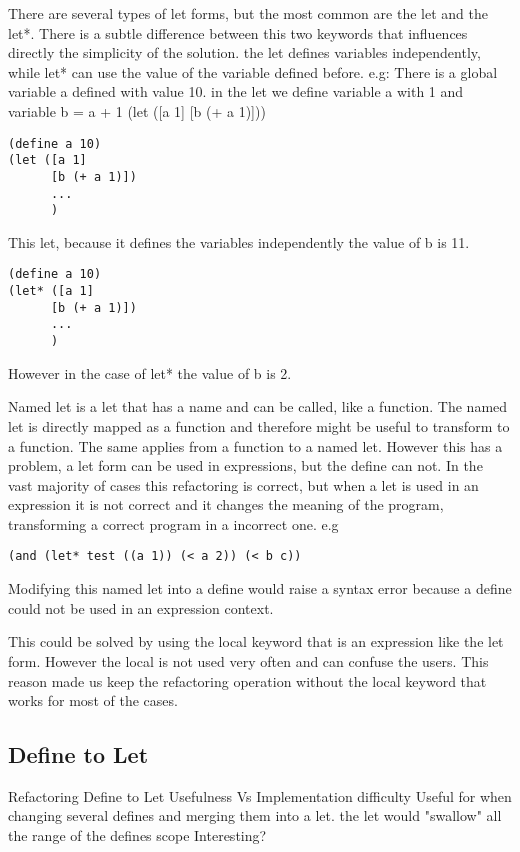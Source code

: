 There are several types of let forms, but the most common are the let and the let*.
There is a subtle difference between this two keywords that influences directly the simplicity of the solution.
the let defines variables independently, while let* can use the value of the variable defined before.
e.g:
There is a global variable a defined with value 10.
in the let we define variable a with 1 and variable b = a + 1
(let ([a 1]
[b (+ a 1)]))

\begin{lstlisting}[basicstyle=\ttfamily, caption="Example"]
(define a 10)
(let ([a 1]
      [b (+ a 1)])
      ...
      )
\end{lstlisting}
This let, because it defines the variables independently the value of b is 11.

\begin{lstlisting}[basicstyle=\ttfamily, caption="Example"]
(define a 10)
(let* ([a 1]
      [b (+ a 1)])
      ...
      )
\end{lstlisting}
However in the case of let* the value of b is 2.


Named let is a let that has a name and can be called, like a function.
The named let is directly mapped as a function and therefore might be useful to transform to a function.
The same applies from a function to a named let.
However this has a problem, a let form can be used in expressions, but the define can not.
In the vast majority of cases this refactoring is correct, but when a let is used in an expression
it is not correct and it changes the meaning of the program, transforming a correct
program in a incorrect one.
e.g
\begin{lstlisting}[basicstyle=\ttfamily, caption="Example"]
(and (let* test ((a 1)) (< a 2)) (< b c))
\end{lstlisting}
Modifying this named let into a define would raise a syntax error because a
define could not be used in an expression context.

This could be solved by using the local keyword that is an expression like
the let form.
However the local is not used very often and can confuse the users. This reason
made us keep the refactoring operation without the local keyword that works for
most of the cases.


\subsection{Define to Let} %
Refactoring Define to Let Usefulness Vs Implementation difficulty
Useful for when changing several defines and merging them into a let.
the let would "swallow" all the range of the defines scope
Interesting?

